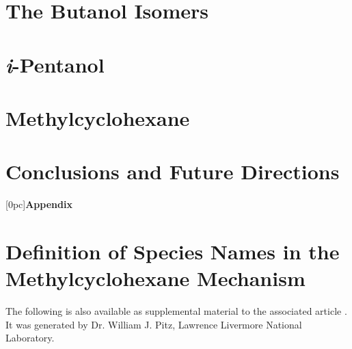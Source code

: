 \documentclass[12pt, letterpaper,oneside]{book}
\begin{document}
\chapter{The Butanol Isomers}
\label{chap:buoh}

\cleardoublepage

\chapter{\textit{i}-Pentanol}
\label{chap:peoh}

\cleardoublepage

\chapter{Methylcyclohexane}
\label{chap:mch}

\cleardoublepage

\chapter{Conclusions and Future Directions}
\label{chap:conclusions}

\cleardoublepage

\printbibliography[heading=bibintoc]

\begin{appendices}
{}
[0pc]{}{\bfseries Appendix \thecontentslabel\quad}{}{\contentspage}
\chapter{Definition of Species Names in the Methylcyclohexane Mechanism}
\label{app:mch-dict}
The following is also available as supplemental material to the associated article \cite{Weber2014}.
It was generated by Dr. William J. Pitz, Lawrence Livermore National Laboratory.

\end{appendices}
\end{document}
